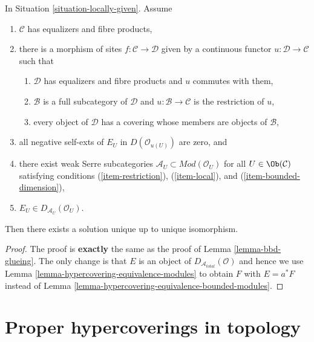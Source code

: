 \begin{lemma}
\label{lemma-bbd-unbounded-glueing}
In Situation \ref{situation-locally-given}. Assume
\begin{enumerate}
\item $\mathcal{C}$ has equalizers and fibre products,
\item there is a morphism of sites $f : \mathcal{C} \to \mathcal{D}$
given by a continuous functor $u : \mathcal{D} \to \mathcal{C}$
such that
\begin{enumerate}
\item $\mathcal{D}$ has equalizers and fibre products and $u$
commutes with them,
\item $\mathcal{B}$ is a full subcategory of $\mathcal{D}$
and $u : \mathcal{B} \to \mathcal{C}$ is the restriction of $u$,
\item every object of $\mathcal{D}$ has a covering whose members
are objects of $\mathcal{B}$,
\end{enumerate}
\item all negative self-exts of $E_U$ in $D(\mathcal{O}_{u(U)})$ are zero, and
\item there exist weak Serre subcategories
$\mathcal{A}_U \subset \textit{Mod}(\mathcal{O}_U)$ for all
$U \in \Ob(\mathcal{C})$ satisfying conditions (\ref{item-restriction}),
(\ref{item-local}), and (\ref{item-bounded-dimension}),
\item $E_U \in D_{\mathcal{A}_U}(\mathcal{O}_U)$.
\end{enumerate}
Then there exists a solution unique up to unique isomorphism.
\end{lemma}

\begin{proof}
The proof is {\bf exactly} the same as the proof of
Lemma \ref{lemma-bbd-glueing}. The only change is that
$E$ is an object of $D_{\mathcal{A}_{total}}(\mathcal{O})$
and hence we use Lemma \ref{lemma-hypercovering-equivalence-modules}
to obtain $F$ with $E = a^*F$
instead of Lemma \ref{lemma-hypercovering-equivalence-bounded-modules}.
\end{proof}





\section{Proper hypercoverings in topology}
\label{section-proper-hypercovering}

